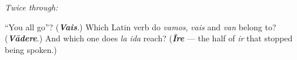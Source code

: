 \emph{Twice through:}

\begin{tcolorbox}[breakable,colback=teal!4,colframe=teal!35!black,title={Before you move on}]
\textquotedblleft{}You all go\textquotedblright{}? (\emph{\textbf{Vais}}.) Which Latin verb do \emph{vamos}, \emph{vais} and \emph{van} belong to? (\emph{\textbf{Vādere}}.) And which one does \emph{la ida} reach? (\emph{\textbf{Īre}} — the half of \emph{ir} that stopped being spoken.)
\end{tcolorbox}
